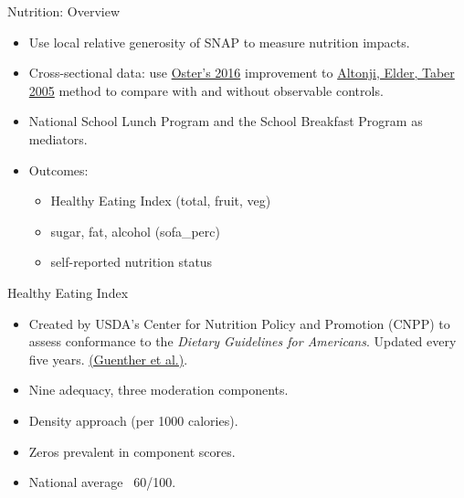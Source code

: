\documentclass{beamer}
\begin{document}
\begin{frame}{Nutrition: Overview}
\begin{itemize}
\item Use local relative generosity of SNAP to measure nutrition impacts.
\item Cross-sectional data: use \href{http://www.tandfonline.com/doi/abs/10.1080/07350015.2016.1227711}{Oster's 2016} improvement to \href{http://www.journals.uchicago.edu/doi/abs/10.1086/426036}{Altonji, Elder, Taber 2005} method to compare with and without observable controls.
\item National School Lunch Program and the School Breakfast Program as mediators.
\item Outcomes:
\begin{itemize}
\item Healthy Eating Index (total, fruit, veg)
\item sugar, fat, alcohol (sofa\_perc)
\item self-reported nutrition status
\end{itemize}
\end{itemize}

\end{frame}



\begin{frame}{Healthy Eating Index}

\begin{itemize}
\item 
 Created by USDA's Center for Nutrition Policy and Promotion (CNPP) to assess conformance to the \textit{Dietary Guidelines for Americans}. Updated every five years. \href{https://www.cnpp.usda.gov/sites/default/files/healthy_eating_index/HEI2010-UpdatePaper.pdf}{(Guenther et al.)}. 
 \item 
Nine adequacy, three moderation components.
\item 
Density approach (per 1000 calories).
\item 
Zeros prevalent in component scores.
\item 
National average ~60/100. 
\end{itemize}
\end{frame}
\end{document}
